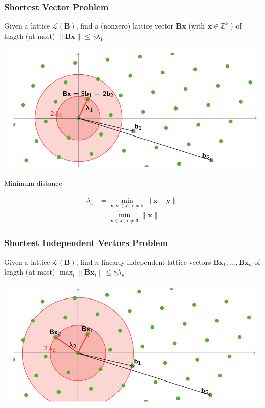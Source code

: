 \documentclass{beamer}
\begin{document}
\begin{frame}
	\frametitle{Shortest Vector Problem}
	\begin{definition}
		Given a lattice $\mathcal{L}(\mathbf{B})$, find a (nonzero) lattice vector $\mathbf{B x}$ (with $\mathbf{x} \in \mathbb{Z}^k$ ) of length (at most) $\|\mathbf{B} \mathbf{x}\| \leq \gamma \lambda_1$
	\end{definition}
	\includegraphics[scale=0.5]{svp.png}
	
	Minimum distance

$$
\begin{aligned}
\lambda_1 & =\min _{\mathbf{x}, \mathbf{y} \in \mathcal{L}, \mathbf{x} \neq \mathbf{y}}\|\mathbf{x}-\mathbf{y}\| \\
& =\min _{\mathbf{x} \in \mathcal{L}, \mathbf{x} \neq \mathbf{0}}\|\mathbf{x}\|
\end{aligned}
$$


\end{frame}

\begin{frame}
	\frametitle{Shortest Independent Vectors Problem}
	\begin{definition}
		Given a lattice $\mathcal{L}(\mathbf{B})$, find $n$ linearly independent lattice vectors $\mathbf{B x}_1, \ldots, \mathbf{B} \mathbf{x}_n$ of length (at most) $\max _i\left\|\mathbf{B} \mathbf{x}_i\right\| \leq \gamma \lambda_n$
	\end{definition}
	\includegraphics[scale=0.7]{sivp.png}

\end{frame}
\end{document}
